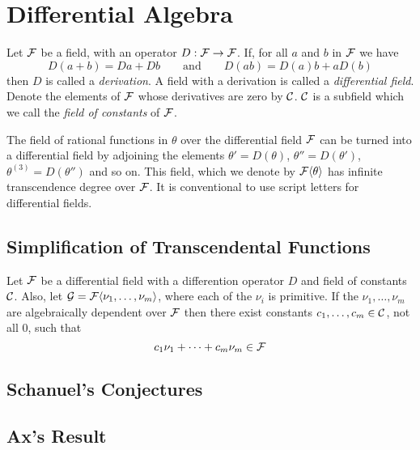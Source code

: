 \chapter{Differential Algebra}
\label{Diff:Alg:Chap}

Let ${\cal F}$ be a field, with an operator $D : {\cal F} \rightarrow
{\cal F}$.  If, for all $a$ and $b$ in ${\cal F}$ we have
\[
D(a+b) = Da + Db \qquad\mbox{and}\qquad
D(ab) = D(a)b + a D(b)
\]
then $D$ is called a {\em derivation\/}.  A field with a derivation is
called a {\em differential field\/}.  Denote the elements of ${\cal F}$ whose
derivatives are zero by ${\cal C}$.  ${\cal C}$ is a subfield which we
call the {\em field of constants} of ${\cal F}$.

The field of rational functions in $\theta$ over the differential field
${\cal F}$ can be turned into a differential field by adjoining the
elements $\theta' = D(\theta)$, $\theta'' = D(\theta')$, $\theta^{(3)} =
D(\theta'')$ and so on.  This field, which we denote by ${\cal
F}\langle\theta\rangle$ has infinite transcendence degree over ${\cal F}$.
It is conventional to use script letters for differential fields.


\section{Simplification of Transcendental Functions}

\begin{proposition}
Let ${\cal F}$ be a differential field with a differention operator
$D$ and field of constants ${\cal C}$.  Also, let ${\cal G} = {\cal
F}\langle \nu_1, \ldots, \nu_m\rangle$, where each of the $\nu_i$ is
primitive.  If the $\nu_1, \ldots, \nu_m$ are algebraically dependent
over ${\cal F}$ then there exist constants $c_1, \ldots, c_m \in {\cal
C}$, not all $0$, such that 
\[
c_1 \nu_1 + \cdots + c_m \nu_m \in {\cal F}
\]
\end{proposition}


\section{Schanuel's Conjectures}

\section{Ax's Result}



